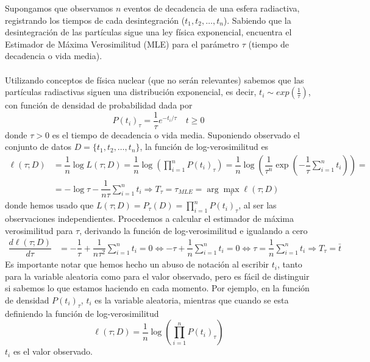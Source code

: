 \begin{ejercicio}
    Supongamos que observamos $n$ eventos de decadencia de una esfera radiactiva, registrando los tiempos de cada desintegración ($t_1, t_2, \dots, t_n$). Sabiendo que la desintegración de las partículas sigue una ley física exponencial, encuentra el Estimador de Máxima Verosimilitud (MLE) para el parámetro $\tau$ (tiempo de decadencia o vida media).\\ \\

    \noindent
    Utilizando conceptos de física nuclear (que no serán relevantes) sabemos que las partículas radiactivas siguen una distribución exponencial, es decir, $t_i \sim exp\left(\frac{1}{\tau}\right)$, con función de densidad de probabilidad dada por
    \begin{equation*}
        P(t_i)_{\tau} = \dfrac{1}{\tau} e^{-t_i/\tau} \quad t \geq 0
    \end{equation*}
    donde $\tau>0$ es el tiempo de decadencia o vida media. Suponiendo observado el conjunto de datos $D = \{t_1, t_2, \ldots, t_n\}$, la función de log-verosimilitud es
    \begin{align*}
        \ell(\tau; D) &= \dfrac{1}{n} \log L(\tau; D) = \dfrac{1}{n} \log \left( \prod\limits_{i=1}^{n} P(t_i)_{\tau} \right) = \dfrac{1}{n}  \log\left(\dfrac{1}{\tau^n} \exp\left( -\dfrac{1}{\tau} \sum\limits_{i=1}^{n} t_i \right)\right) = \\
        &= -\log \tau - \dfrac{1}{n\tau}\sum\limits_{i=1}^{n} t_i \Longrightarrow T_{\tau}=\tau_{MLE} = \arg \max_{\tau} \ell(\tau; D)
    \end{align*}
    donde hemos usado que $L(\tau;D) = P_{\tau}(D) = \prod\limits_{i=1}^{n} P(t_i)_{\tau}$, al ser las observaciones independientes. Procedemos a calcular el estimador de máxima verosimilitud para $\tau$, derivando la función de log-verosimilitud e igualando a cero
    \begin{align*}
        \dfrac{d \ell(\tau; D)}{d \tau} &= -\dfrac{1}{\tau} + \dfrac{1}{n\tau^2}\sum\limits_{i=1}^{n} t_i = 0 \Longleftrightarrow -\tau + \dfrac{1}{n} \sum\limits_{i=1}^{n} t_i = 0 \Longleftrightarrow \tau = \dfrac{1}{n} \sum\limits_{i=1}^{n} t_i \Longrightarrow T_{\tau} = \bar{t}
    \end{align*}
    Es importante notar que hemos hecho un abuso de notación al escribir $t_i$, tanto para la variable aleatoria como para el valor observado, pero es fácil de distinguir si sabemos lo que estamos haciendo en cada momento. Por ejemplo, en la función de densidad $P(t_i)_{\tau}$, $t_i$ es la variable aleatoria, mientras que cuando se esta definiendo la función de log-verosimilitud 
    $$\ell(\tau; D)= \dfrac{1}{n} \log \left( \prod\limits_{i=1}^{n} P(t_i)_{\tau} \right)$$
    $t_i$ es el valor observado. \\ \\
\end{ejercicio}

